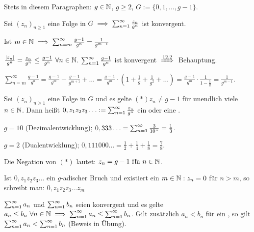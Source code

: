 \documentclass[a4paper,twoside,DIV15,BCOR12mm]{scrbook}
\begin{document}
\begin{vereinbarung}
Stets in diesem Paragraphen: $g\in\mathbb{N}$, $g\ge 2$, $G := \{0,1,\ldots,g-1\}$.
\end{vereinbarung}

\begin{satz}
\begin{liste}
\item Sei $(z_n)_{n\ge1}$ eine Folge in $G \implies \sum_{n=1}^{\infty}{\frac{z_n}{g^n}}$ ist konvergent.
\item Ist $m\in\mathbb{N} \implies \sum_{n=m}^\infty{\frac{g-1}{g^n}} = \frac{1}{g^{m-1}}$
\end{liste}
\end{satz}

\begin{beweise}
\item $\frac{|z_n|}{g^n} = \frac{z_n}{g^n} \le \frac{g-1}{g^n} \ \forall n\in\mathbb{N}$. $\sum_{n=1}^{\infty}{\frac{g-1}{g^n}}$ ist konvergent $\folgtnach{12.2}$ Behauptung.
\item $\sum_{n=m}^\infty\frac{g-1}{g^n} = \frac{g-1}{g^m} + \frac{g-1}{g^{m+1}} + \ldots = \frac{g-1}{g^m} \cdot ( 1+ \frac{1}{g} + \frac{1}{g^2} + \ldots ) = \frac{g-1}{g^m} \cdot \frac{1}{1-\frac{1}{g}} = \frac{1}{g^{m-1}}$.
\end{beweise}

\begin{definition}
Sei $(z_n)_{n\ge 1}$ eine Folge in  $G$ und es gelte $(*) z_n \ne g-1$ für unendlich viele $n\in\mathbb{N}$. Dann heißt $0,z_1z_2z_3\ldots := \sum_{n=1}^{\infty}{\frac{z_n}{g^n}}$ ein  oder eine .
\end{definition}

\begin{beispiele}
\item $g=10$ (Dezimalentwicklung); $0,333\ldots = \sum_{n=1}^{\infty}{\frac{3}{10^n}} = \frac{1}{3}$.
\item $g=2$ (Dualentwicklung); $0,111000\ldots = \frac{1}{2} + \frac{1}{4} + \frac{1}{8} = \frac{7}{8}$.
\end{beispiele}

\begin{bemerkung}
\begin{liste}
\item Die Negation von $(*)$ lautet: $z_n = g-1 \text{ f\/fa } n\in\mathbb{N}$.
\item Ist $0,z_1z_2z_3\ldots$ ein $g$-adischer Bruch und existiert ein $m\in\mathbb{N}: z_n = 0$ für $n>m$, so schreibt man: $0,z_1z_2z_3\ldots z_m$
\item $\sum_{n=1}^{\infty}{a_n}$ und $\sum_{n=1}^{\infty}{b_n}$ seien konvergent und es gelte $a_n \le b_n \ \forall n\in\mathbb{N} \implies \sum_{n=1}^{\infty}{a_n} \le \sum_{n=1}^{\infty}{b_n}$. Gilt zusätzlich $a_n<b_n$ für ein \natn, so gilt $\sum_{n=1}^{\infty}{a_n} < \sum_{n=1}^{\infty}{b_n}$ (Beweis in Übung).
\end{liste}
\end{bemerkung}
\end{document}
